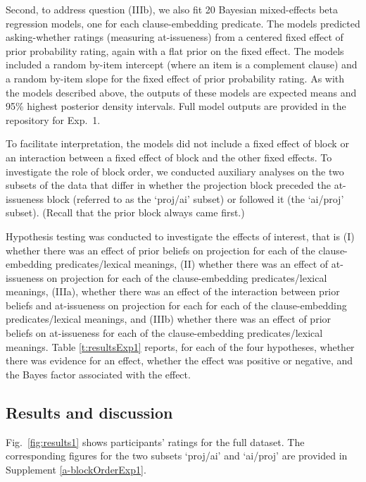\documentclass[11pt,fleqn]{article}
\newcommand{\6}{\mbox{$[\hspace*{-.6mm}[$}}
\newcommand{\9}{\mbox{$]\hspace*{-.6mm}]$}}
\begin{document}
Second, to address question (IIIb), we also fit 20 Bayesian mixed-effects beta regression models, one for each clause-embedding predicate. The models predicted asking-whether ratings (measuring at-issueness) from a centered fixed effect of prior probability rating, again with a flat prior on the fixed effect. The models included a random by-item intercept (where an item is a complement clause) and a random by-item slope for the fixed effect of prior probability rating. As with the models described above, the outputs of these models are expected means and 95\% highest posterior density intervals. Full model outputs are provided in the repository for Exp.~1.

To facilitate interpretation, the models did not include a fixed effect of block or an interaction between a fixed effect of block and the other fixed effects. To investigate the role of block order, we conducted auxiliary analyses on the two subsets of the data that differ in whether the projection block preceded the at-issueness block (referred to as the `proj/ai' subset) or followed it (the `ai/proj' subset). (Recall that the prior block always came first.) 

Hypothesis testing was conducted to investigate the effects of interest, that is (I) whether there was an effect of prior beliefs on projection for each of the clause-embedding predicates/lexical meanings, (II) whether there was an effect of at-issueness on projection for each of the clause-embedding predicates/lexical meanings, (IIIa), whether there was an effect of the interaction between prior beliefs and at-issueness on projection for each  for each of the clause-embedding predicates/lexical meanings, and (IIIb) whether there was an effect of prior beliefs on at-issueness for each of the clause-embedding predicates/lexical meanings. Table \ref{t:resultsExp1} reports, for each of the four hypotheses, whether there was evidence for an effect, whether the effect was positive or negative, and the Bayes factor associated with the effect. 

\subsection{Results and discussion}\label{s-results-exp1}

Fig.~\ref{fig:results1} shows participants' ratings for the full dataset. The corresponding figures for the two subsets `proj/ai' and `ai/proj' are provided in Supplement \ref{a-blockOrderExp1}.
\end{document}
